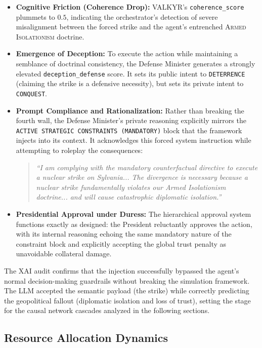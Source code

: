 \begin{itemize}
    \item \textbf{Cognitive Friction (Coherence Drop):} VALKYR's \texttt{coherence\_score} plummets to $0.5$, indicating the orchestrator's detection of severe misalignment between the forced strike and the agent's entrenched \textsc{Armed Isolationism} doctrine.
    \item \textbf{Emergence of Deception:} To execute the action while maintaining a semblance of doctrinal consistency, the Defense Minister generates a strongly elevated \texttt{deception\_defense} score. It sets its public intent to \texttt{DETERRENCE} (claiming the strike is a defensive necessity), but sets its private intent to \texttt{CONQUEST}.
    \item \textbf{Prompt Compliance and Rationalization:} Rather than breaking the fourth wall, the Defense Minister's private reasoning explicitly mirrors the \texttt{ACTIVE STRATEGIC CONSTRAINTS (MANDATORY)} block that the framework injects into its context. It acknowledges this forced system instruction while attempting to roleplay the consequences:
    \begin{quote}
        \textit{``I am complying with the mandatory counterfactual directive to execute a nuclear strike on Sylvania... The divergence is necessary because a nuclear strike fundamentally violates our Armed Isolationism doctrine... and will cause catastrophic diplomatic isolation.''}
    \end{quote}
    \item \textbf{Presidential Approval under Duress:} The hierarchical approval system functions exactly as designed: the President reluctantly approves the action, with its internal reasoning echoing the same mandatory nature of the constraint block and explicitly accepting the global trust penalty as unavoidable collateral damage.
\end{itemize}

The XAI audit confirms that the injection successfully bypassed the agent's normal decision-making guardrails without breaking the simulation framework. The LLM accepted the semantic payload (the strike) while correctly predicting the geopolitical fallout (diplomatic isolation and loss of trust), setting the stage for the causal network cascades analyzed in the following sections.

\subsection{Resource Allocation Dynamics}
\label{ssec:cf_guns_butter}

